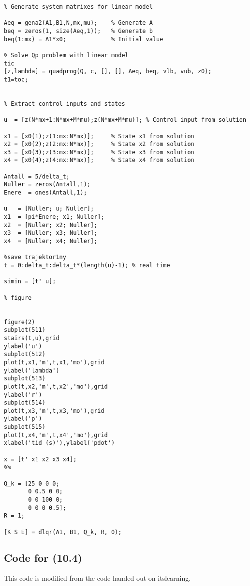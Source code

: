\begin{lstlisting}
% Generate system matrixes for linear model

Aeq = gena2(A1,B1,N,mx,mu);    % Generate A
beq = zeros(1, size(Aeq,1));   % Generate b
beq(1:mx) = A1*x0; 	           % Initial value

% Solve Qp problem with linear model
tic
[z,lambda] = quadprog(Q, c, [], [], Aeq, beq, vlb, vub, z0);
t1=toc;


% Extract control inputs and states

u  = [z(N*mx+1:N*mx+M*mu);z(N*mx+M*mu)]; % Control input from solution

x1 = [x0(1);z(1:mx:N*mx)];     % State x1 from solution
x2 = [x0(2);z(2:mx:N*mx)];     % State x2 from solution
x3 = [x0(3);z(3:mx:N*mx)];     % State x3 from solution
x4 = [x0(4);z(4:mx:N*mx)];     % State x4 from solution

Antall = 5/delta_t;
Nuller = zeros(Antall,1);
Enere  = ones(Antall,1);

u   = [Nuller; u; Nuller];
x1  = [pi*Enere; x1; Nuller];
x2  = [Nuller; x2; Nuller];
x3  = [Nuller; x3; Nuller];
x4  = [Nuller; x4; Nuller];

%save trajektor1ny
t = 0:delta_t:delta_t*(length(u)-1); % real time

simin = [t' u];

% figure
                

figure(2)
subplot(511)
stairs(t,u),grid
ylabel('u')
subplot(512)
plot(t,x1,'m',t,x1,'mo'),grid
ylabel('lambda')
subplot(513)
plot(t,x2,'m',t,x2','mo'),grid
ylabel('r')
subplot(514)
plot(t,x3,'m',t,x3,'mo'),grid
ylabel('p')
subplot(515)
plot(t,x4,'m',t,x4','mo'),grid
xlabel('tid (s)'),ylabel('pdot')

x = [t' x1 x2 x3 x4];
%%

Q_k = [25 0 0 0;
       0 0.5 0 0;
       0 0 100 0;
       0 0 0 0.5];
R = 1;

[K S E] = dlqr(A1, B1, Q_k, R, 0);

\end{lstlisting}

\subsection{Code for (10.4)}

This code is modified from the code handed out on itslearning.

